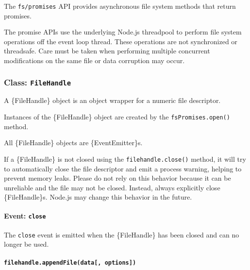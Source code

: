 The \texttt{fs/promises} API provides asynchronous file system methods
that return promises.

The promise APIs use the underlying Node.js threadpool to perform file
system operations off the event loop thread. These operations are not
synchronized or threadsafe. Care must be taken when performing multiple
concurrent modifications on the same file or data corruption may occur.

\subsubsection{\texorpdfstring{Class:
\texttt{FileHandle}}{Class: FileHandle}}\label{class-filehandle}

A \{FileHandle\} object is an object wrapper for a numeric file
descriptor.

Instances of the \{FileHandle\} object are created by the
\texttt{fsPromises.open()} method.

All \{FileHandle\} objects are \{EventEmitter\}s.

If a \{FileHandle\} is not closed using the \texttt{filehandle.close()}
method, it will try to automatically close the file descriptor and emit
a process warning, helping to prevent memory leaks. Please do not rely
on this behavior because it can be unreliable and the file may not be
closed. Instead, always explicitly close \{FileHandle\}s. Node.js may
change this behavior in the future.

\paragraph{\texorpdfstring{Event:
\texttt{\textquotesingle{}close\textquotesingle{}}}{Event: \textquotesingle close\textquotesingle{}}}\label{event-close}

The \texttt{\textquotesingle{}close\textquotesingle{}} event is emitted
when the \{FileHandle\} has been closed and can no longer be used.

\paragraph{\texorpdfstring{\texttt{filehandle.appendFile(data{[},\ options{]})}}{filehandle.appendFile(data{[}, options{]})}}\label{filehandle.appendfiledata-options}

